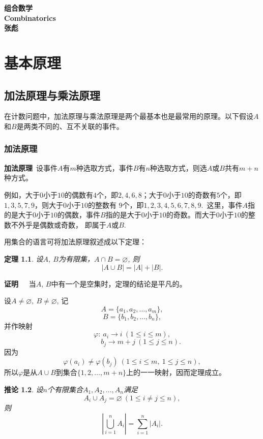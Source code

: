 \documentclass[a4paper,11pt,twoside]{book}
\newtheorem{thm}{定理}[section]
\newtheorem{coro}[thm]{推论}
\def\pf{{\bf 证明~~ }}
\begin{document}
\begin{titlepage}
	\begin{center}
		\vspace*{5cm}
		\noindent \Huge  \textbf{组\quad 合\quad 数\quad 学} \\
		\vspace*{1cm}
		\noindent \Huge \textbf{Combinatorics} \\
		\vspace*{2cm}
		\noindent \LARGE \textbf{张\quad 彪} 
	\end{center}
\end{titlepage}


\cleardoublepage
\dominitoc
 \tableofcontents
\mainmatter

\chapter{基本原理}
\label{chap1} \minitoc

\section{加法原理与乘法原理}
在计数问题中，加法原理与乘法原理是两个最基本也是最常用的原理。以下假设$A$和$B$是两类不同的、互不关联的事件。
\subsection{加法原理}
\textbf{加法原理}\
设事件$A$有$m$种选取方式，事件$B$有$n$种选取方式，则选$A$或$B$共有$m+n$种方式。

例如，大于$0$小于$10$的偶数有$4$个，即$2,4,6,8$；大于$0$小于$10$的奇数有$5$个，即$1,3,5,7,9$，则大于$0$小于$10$的整数有
$9$个，即$1,2,3,4,5,6,7,8,9.$\
这里，事件$A$指的是大于$0$小于$10$的偶数，事件$B$指的是大于$0$小于$10$的奇数。而大于$0$小于$10$的整数不外乎是偶数或奇数，
即属于$A$或$B$.

用集合的语言可将加法原理叙述成以下定理：
\begin{thm}
设$A$, $B$为有限集，$A\cap B=\varnothing$, 则$$|A\cup B|=|A|+|B|.$$
\end{thm}
\pf 当$A$, $B$中有一个是空集时，定理的结论是平凡的。

设$A\neq \varnothing,\ B\neq \varnothing$, 记$$A=\{a_1, a_2, \ldots,
a_m\},$$
$$B=\{b_1, b_2, \ldots,
b_n\},$$ 并作映射$$\varphi :\ a_i\rightarrow i\ (1\leq i\leq m),$$
$$\ \ \ \ \ \ \ \ \ \ \ b_j\rightarrow m+j\ (1\leq j\leq n).$$
因为$$\varphi(a_i)\neq \varphi (b_j)\ (1\leq i\leq m,\ 1\leq j\leq n
),$$ 所以$\varphi$是从$A\cup
B$到集合$\{1,2,\ldots,m+n\}$上的一一映射，因而定理成立。
\begin{coro}
设$n$个有限集合$A_1,A_2,\ldots,A_n$满足$$A_i\cup A_j=\varnothing\
(1\leq i \neq j\leq n),$$ 则$$|\bigcup_{i=1}^n A_i|=\sum_{i=1}^n
|A_i|.$$
\end{coro}
\end{document}
